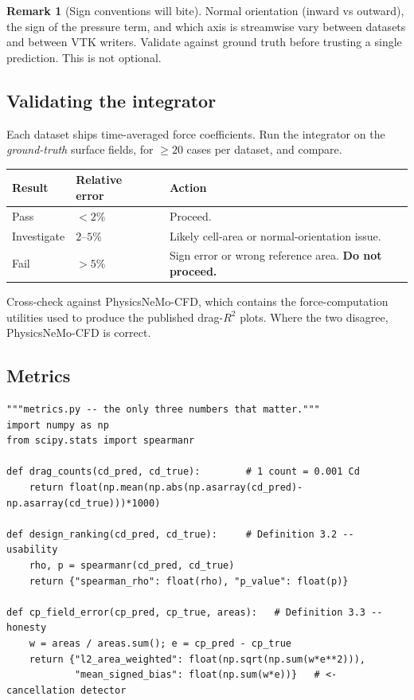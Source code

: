 \documentclass[10pt,a4paper]{article}
\theoremstyle{definition}
\newtheorem{remark}{Remark}[section]
\DeclareMathOperator{\Cd}{C_d}
\begin{document}
\begin{remark}[Sign conventions will bite]
Normal orientation (inward vs outward), the sign of the pressure term, and which
axis is streamwise vary between datasets and between VTK writers. Validate against
ground truth before trusting a single prediction. This is not optional.
\end{remark}

\subsection{Validating the integrator}

Each dataset ships time-averaged force coefficients. Run the integrator on the
\emph{ground-truth} surface fields, for $\geq 20$ cases per dataset, and compare.

\begin{center}\small
\begin{tabular}{@{}p{2.4cm}p{3.2cm}p{9cm}@{}}
\toprule
\textbf{Result} & \textbf{Relative $\Cd$ error} & \textbf{Action} \\
\midrule
Pass         & $< 2\%$   & Proceed. \\
Investigate  & $2$--$5\%$ & Likely cell-area or normal-orientation issue. \\
Fail         & $> 5\%$   & Sign error or wrong reference area. \textbf{Do not proceed.} \\
\bottomrule
\end{tabular}
\end{center}

Cross-check against PhysicsNeMo-CFD, which contains the force-computation utilities
used to produce the published drag-$R^2$ plots. Where the two disagree, PhysicsNeMo-CFD
is correct.

\subsection{Metrics}

\begin{lstlisting}
"""metrics.py -- the only three numbers that matter."""
import numpy as np
from scipy.stats import spearmanr

def drag_counts(cd_pred, cd_true):        # 1 count = 0.001 Cd
    return float(np.mean(np.abs(np.asarray(cd_pred)-np.asarray(cd_true)))*1000)

def design_ranking(cd_pred, cd_true):     # Definition 3.2 -- usability
    rho, p = spearmanr(cd_pred, cd_true)
    return {"spearman_rho": float(rho), "p_value": float(p)}

def cp_field_error(cp_pred, cp_true, areas):   # Definition 3.3 -- honesty
    w = areas / areas.sum(); e = cp_pred - cp_true
    return {"l2_area_weighted": float(np.sqrt(np.sum(w*e**2))),
            "mean_signed_bias": float(np.sum(w*e))}   # <- cancellation detector
\end{lstlisting}
\end{document}
